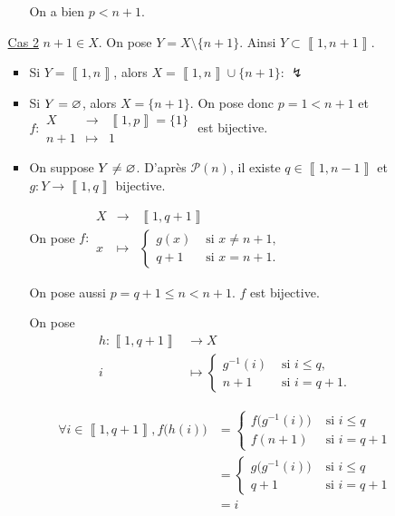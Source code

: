 \begin{prv}
\begin{itemize}
\begin{itemize}
\begin{itemize}
							On a bien $p < n + 1$.
					\end{itemize}
				\item[\underline{\sc Cas 2}] $n + 1 \in X$. On pose $Y = X \setminus \{n + 1\}$. Ainsi $Y \subset \left\llbracket 1,n+1 \right\rrbracket$.
					\begin{itemize}
						\item Si $Y = \left\llbracket 1,n \right\rrbracket$, alors $X = \left\llbracket 1,n \right\rrbracket \cup \{n+1\}$: $\lightning$
						\item Si $Y = \varnothing$, alors $X = \{n + 1\}$. On pose donc $p = 1 < n+1$ et $f : \begin{array}{rcl}
								X &\longrightarrow& \left\llbracket 1,p \right\rrbracket = \{1\} \\
								n+1 &\longmapsto& 1
							\end{array}$ est bijective.
						\item On suppose $Y \neq \varnothing$. D'après $\mathcal{P}(n)$, il existe $q \in  \left\llbracket 1,n-1 \right\rrbracket$ et $g: Y \to \left\llbracket 1,q \right\rrbracket$ bijective.

							On pose  $f : \begin{array}{rcl}
								X &\longrightarrow& \left\llbracket 1,q+1 \right\rrbracket \\
								x &\longmapsto& \begin{cases}
									g(x) &\text{ si } x \neq n+1,\\
									q + 1 &\text{ si } x = n + 1.
								\end{cases}
							\end{array}$

							On pose aussi $p = q + 1 \le n < n + 1$. $f$ est bijective.

							On pose \begin{align*}
								h: \left\llbracket 1,q+1 \right\rrbracket &\longrightarrow X \\
								i &\longmapsto \begin{cases}
									g^{-1}(i) &\text{ si } i \le q,\\
									n + 1 &\text{ si } i = q + 1.
								\end{cases}
							\end{align*}

							\begin{align*}
								\forall i \in \left\llbracket 1,q+1 \right\rrbracket, f\big(h(i)\big)
								&= \begin{cases}
									f\big(g^{-1}(i)\big) &\text{ si } i \le q\\
									f(n+1) &\text{ si } i = q + 1
								\end{cases} \\
								&= \begin{cases}
									g\big(g^{-1}(i)\big) &\text{ si } i \le q\\
									q+1 &\text{ si } i = q + 1
								\end{cases} \\
								&= i \\
							\end{align*}


\end{itemize}
\end{itemize}
\end{itemize}
\end{prv}
